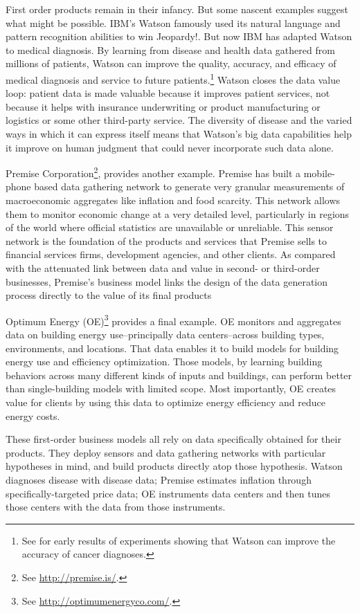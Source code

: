 \documentclass[12pt]{article}
\begin{document}
First order products remain in their infancy. But some nascent
examples suggest what might be possible. IBM's Watson famously used
its natural language and pattern recognition abilities to win
Jeopardy!. But now IBM has adapted Watson to medical diagnosis. By
learning from disease and health data gathered from millions of
patients, Watson can improve the quality, accuracy, and efficacy of
medical diagnosis and service to future patients.\footnote{See
\cite{wired2013a} for early results of experiments showing that Watson
can improve the accuracy of cancer diagnoses.} Watson closes the data
value loop: patient data is made valuable because it improves patient
services, not because it helps with insurance underwriting or product
manufacturing or logistics or some other third-party service. The
diversity of disease and the varied ways in which it can express
itself means that Watson's big data capabilities help it improve on
human judgment that could never incorporate such data alone.

Premise Corporation\footnote{See \url{http://premise.is/}.}, provides another example. Premise has built a mobile-phone
based data gathering network to generate very granular measurements of
macroeconomic aggregates like inflation and food scarcity. This
network allows them to monitor economic change at a very detailed
level, particularly in regions of the world where official statistics
are unavailable or unreliable. This sensor network is the foundation
of the products and services that Premise sells to financial services
firms, development agencies, and other clients. As compared with the
attenuated link between data and value in second- or third-order
businesses, Premise's business model links the design of the data
generation process directly to the value of its final products

Optimum Energy (OE)\footnote{See \url{http://optimumenergyco.com/}.} provides a final example. OE monitors and
aggregates data on building energy use--principally data
centers--across building types, environments, and locations. That data
enables it to build models for building energy use and efficiency
optimization. Those models, by learning building behaviors across many
different kinds of inputs and buildings, can perform better than
single-building models with limited scope. Most importantly, OE
creates value for clients by using this data to optimize energy
efficiency and reduce energy costs.

These first-order business models all rely on data specifically
obtained for their products. They deploy sensors and data gathering
networks with particular hypotheses in mind, and build products directly
atop those hypothesis. Watson diagnoses disease with disease data;
Premise estimates inflation through specifically-targeted price data;
OE instruments data centers and then tunes those centers with the data
from those instruments.
\end{document}
